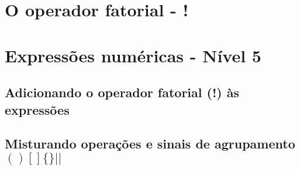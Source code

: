 \section{O operador fatorial - !}

\section{Expressões numéricas - Nível 5}

\subsection{Adicionando o operador fatorial (!) às expressões}

\subsection{Misturando operações e sinais de agrupamento  $ ( ) [ ] \{ \} || $}

